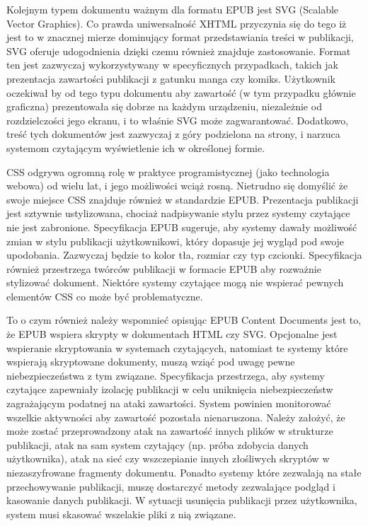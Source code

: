 Kolejnym typem dokumentu ważnym dla formatu EPUB jest SVG (Scalable Vector Graphics). Co prawda uniwersalność XHTML przyczynia się do tego iż jest to w znacznej mierze dominujący format przedstawiania treści w publikacji, SVG oferuje udogodnienia dzięki czemu również znajduje zastosowanie. Format ten jest zazwyczaj wykorzystywany w specyficznych przypadkach, takich jak prezentacja zawartości publikacji z gatunku manga czy komiks. Użytkownik oczekiwał by od tego typu dokumentu aby zawartość (w tym przypadku głównie graficzna) prezentowała się dobrze na każdym urządzeniu, niezależnie od rozdzielczości jego ekranu, i to właśnie SVG może zagwarantować. Dodatkowo, treść tych dokumentów jest zazwyczaj z góry podzielona na strony, i narzuca systemom czytającym wyświetlenie ich w określonej formie.

CSS odgrywa ogromną rolę w praktyce programistycznej (jako technologia webowa) od wielu lat, i jego możliwości wciąż rosną. Nietrudno się domyślić że swoje miejsce CSS znajduje również w standardzie EPUB. Prezentacja publikacji jest sztywnie ustylizowana, chociaż nadpisywanie stylu przez systemy czytające nie jest zabronione. Specyfikacja EPUB sugeruje, aby systemy dawały możliwość zmian w stylu publikacji użytkownikowi, który dopasuje jej wygląd pod swoje upodobania. Zazwyczaj będzie to kolor tła, rozmiar czy typ czcionki. Specyfikacja również przestrzega twórców publikacji w formacie EPUB aby rozważnie stylizować dokument. Niektóre systemy czytające mogą nie wspierać pewnych elementów CSS co może być problematyczne\cite{EPUBContentDocumentsSpecificationCSS}.

To o czym również należy wspomnieć opisując EPUB Content Documents jest to, że EPUB wspiera skrypty w dokumentach HTML czy SVG. Opcjonalne jest wspieranie skryptowania w systemach czytających, natomiast te systemy które wspierają skryptowane dokumenty, muszą wziąć pod uwagę pewne niebezpieczeństwa z tym związane. Specyfikacja przestrzega, aby systemy czytające zapewniały izolację publikacji w celu uniknięcia niebezpieczeństw zagrażającym podatnej na ataki zawartości. System powinien monitorować wszelkie aktywności aby zawartość pozostała nienaruszona. Należy założyć, że może zostać przeprowadzony atak na zawartość innych plików w strukturze publikacji, atak na sam system czytający (np. próba zdobycia danych użytkownika), atak na sieć czy wszczepianie innych złośliwych skryptów w niezaszyfrowane fragmenty dokumentu. Ponadto systemy które zezwalają na stałe przechowywanie publikacji, muszę dostarczyć metody zezwalające podgląd i kasowanie danych publikacji. W sytuacji usunięcia publikacji przez użytkownika, system musi skasować wszelakie pliki z nią związane\cite{EPUBContentDocumentsSpecificationJS}.

